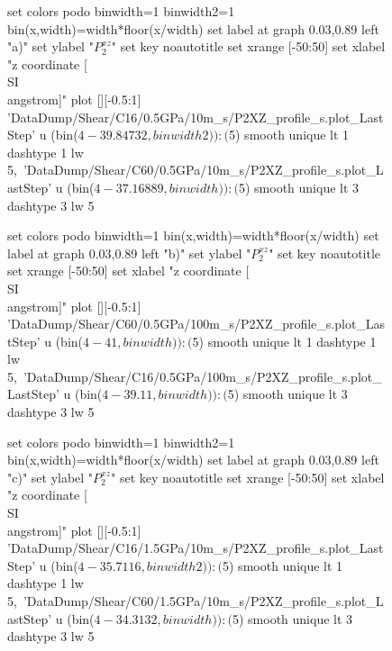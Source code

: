 \documentclass[5p]{elsarticle}
\begin{document}
\begin{figure}[htp]
    	\begin{center}
		\begin{gnuplot}[terminal=epslatex, terminaloptions={size \SERFigwidth cm, \SERFigheight cm color solid}]
			set colors podo
			binwidth=1
			binwidth2=1
			bin(x,width)=width*floor(x/width)
			set label at graph 0.03,0.89 left "a)"
			set ylabel "$P_{2}^{xz}$"
			set key noautotitle
			set xrange [-50:50]
			set xlabel "z coordinate [\\SI{}{\\angstrom}]"  
			plot  	[][-0.5:1] 'DataDump/Shear/C16/0.5GPa/10m_s/P2XZ_profile_s.plot_LastStep'  u (bin($4-39.84732,binwidth2)):($5) smooth unique lt 1 dashtype 1 lw 5,\
				              'DataDump/Shear/C60/0.5GPa/10m_s/P2XZ_profile_s.plot_LastStep'  u (bin($4-37.16889,binwidth)):($5) smooth unique lt 3 dashtype 3 lw 5	
		\end{gnuplot}
		\begin{gnuplot}[terminal=epslatex, terminaloptions={size \SERFigwidth cm, \SERFigheight cm color solid}]
			set colors podo
			binwidth=1
			bin(x,width)=width*floor(x/width)
			set label at graph 0.03,0.89 left "b)"
			set ylabel "$P_{2}^{xz}$"
			set key noautotitle
			set xrange [-50:50]
			set xlabel "z coordinate [\\SI{}{\\angstrom}]"  
			plot  	[][-0.5:1]   'DataDump/Shear/C60/0.5GPa/100m_s/P2XZ_profile_s.plot_LastStep'  u (bin($4-41,binwidth)):($5) smooth unique lt 1 dashtype 1  lw 5,\
				              'DataDump/Shear/C16/0.5GPa/100m_s/P2XZ_profile_s.plot_LastStep'  u (bin($4-39.11,binwidth)):($5) smooth unique lt 3 dashtype 3  lw 5
		\end{gnuplot}
		\begin{gnuplot}[terminal=epslatex, terminaloptions={size \SERFigwidth cm, \SERFigheight cm color solid}]
			set colors podo
			binwidth=1
			binwidth2=1
			bin(x,width)=width*floor(x/width)
			set label at graph 0.03,0.89 left "c)"
			set ylabel "$P_{2}^{xz}$"
			set key noautotitle
			set xrange [-50:50]
			set xlabel "z coordinate [\\SI{}{\\angstrom}]"  
			plot  	[][-0.5:1] 'DataDump/Shear/C16/1.5GPa/10m_s/P2XZ_profile_s.plot_LastStep'  u (bin($4-35.7116,binwidth2)):($5) smooth unique lt 1 dashtype 1  lw 5,\
				              'DataDump/Shear/C60/1.5GPa/10m_s/P2XZ_profile_s.plot_LastStep'  u (bin($4-34.3132,binwidth)):($5) smooth unique lt 3 dashtype 3  lw 5

\end{gnuplot}
\end{center}
\end{figure}
\end{document}
